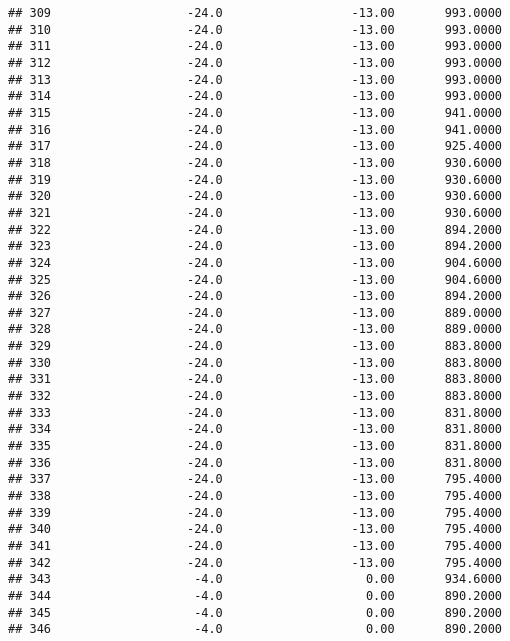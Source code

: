 \documentclass[]{article}
\begin{document}
\begin{verbatim}
## 309                   -24.0                  -13.00       993.0000
## 310                   -24.0                  -13.00       993.0000
## 311                   -24.0                  -13.00       993.0000
## 312                   -24.0                  -13.00       993.0000
## 313                   -24.0                  -13.00       993.0000
## 314                   -24.0                  -13.00       993.0000
## 315                   -24.0                  -13.00       941.0000
## 316                   -24.0                  -13.00       941.0000
## 317                   -24.0                  -13.00       925.4000
## 318                   -24.0                  -13.00       930.6000
## 319                   -24.0                  -13.00       930.6000
## 320                   -24.0                  -13.00       930.6000
## 321                   -24.0                  -13.00       930.6000
## 322                   -24.0                  -13.00       894.2000
## 323                   -24.0                  -13.00       894.2000
## 324                   -24.0                  -13.00       904.6000
## 325                   -24.0                  -13.00       904.6000
## 326                   -24.0                  -13.00       894.2000
## 327                   -24.0                  -13.00       889.0000
## 328                   -24.0                  -13.00       889.0000
## 329                   -24.0                  -13.00       883.8000
## 330                   -24.0                  -13.00       883.8000
## 331                   -24.0                  -13.00       883.8000
## 332                   -24.0                  -13.00       883.8000
## 333                   -24.0                  -13.00       831.8000
## 334                   -24.0                  -13.00       831.8000
## 335                   -24.0                  -13.00       831.8000
## 336                   -24.0                  -13.00       831.8000
## 337                   -24.0                  -13.00       795.4000
## 338                   -24.0                  -13.00       795.4000
## 339                   -24.0                  -13.00       795.4000
## 340                   -24.0                  -13.00       795.4000
## 341                   -24.0                  -13.00       795.4000
## 342                   -24.0                  -13.00       795.4000
## 343                    -4.0                    0.00       934.6000
## 344                    -4.0                    0.00       890.2000
## 345                    -4.0                    0.00       890.2000
## 346                    -4.0                    0.00       890.2000

\end{verbatim}
\end{document}
